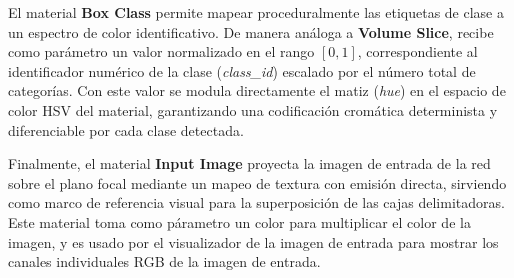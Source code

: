El material \textbf{Box Class} permite mapear proceduralmente las etiquetas de clase a un espectro de color identificativo. 
De manera análoga a \textbf{Volume Slice}, recibe como parámetro un valor normalizado en el rango $[0, 1]$, correspondiente 
al identificador numérico de la clase (\textit{class\_id}) escalado por el número total de categorías. Con este valor se 
modula directamente el matiz (\textit{hue}) en el espacio de color HSV del material, garantizando una codificación cromática 
determinista y diferenciable por cada clase detectada.
\medskip

Finalmente, el material \textbf{Input Image} proyecta la imagen de entrada de la red sobre el plano focal mediante un mapeo 
de textura con emisión directa, sirviendo como marco de referencia visual para la superposición de las cajas delimitadoras.
Este material toma como párametro un color para multiplicar el color de la imagen, y es usado por el visualizador
de la imagen de entrada para mostrar los canales individuales RGB de la imagen de entrada.